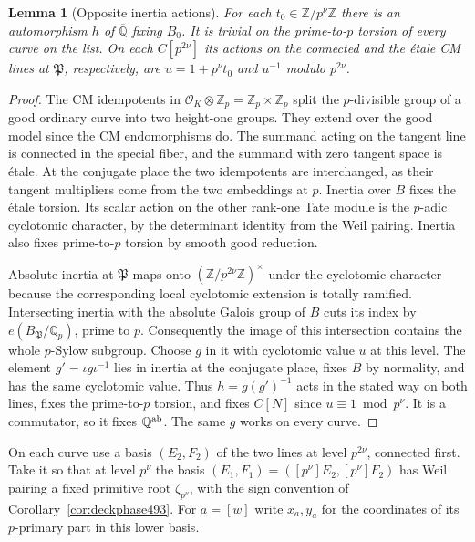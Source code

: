 \documentclass[a4paper,11pt]{article}
\newtheorem{lemma}[proposition]{Lemma}
\theoremstyle{definition}
\theoremstyle{remark}
\numberwithin{equation}{section}
\begin{document}
\begin{lemma}[Opposite inertia actions]\leavevmode
\label{lem:splitinertia494}
For each \(t_0\in\mathbb Z/p^\nu\mathbb Z\) there is an
automorphism \(h\) of \(\overline{\mathbb Q}\) fixing \(B_0\).
It is trivial on the prime-to-\(p\) torsion of every curve on the
list. On each \(C[p^{2\nu}]\) its actions on the connected and
the \'etale CM lines at \(\mathfrak P\), respectively, are
\(u=1+p^\nu t_0\) and \(u^{-1}\) modulo \(p^{2\nu}\).
\end{lemma}
\begin{proof}
The CM idempotents in
\(\mathcal O_K\otimes\mathbb Z_p=\mathbb Z_p\times\mathbb Z_p\)
split the \(p\)-divisible group of a good ordinary curve into
two height-one groups. They extend over the good model since
the CM endomorphisms do. The summand acting on the tangent line
is connected in the special fiber, and the summand with zero
tangent space is \'etale. At the conjugate place the two
idempotents are interchanged, as their tangent multipliers come
from the two embeddings at \(p\). Inertia over \(B\) fixes the
\'etale torsion. Its scalar action on the other rank-one Tate
module is the \(p\)-adic cyclotomic character, by the determinant
identity from the Weil pairing. Inertia also fixes prime-to-\(p\)
torsion by smooth good reduction.

Absolute inertia at \(\mathfrak P\) maps onto
\((\mathbb Z/p^{2\nu}\mathbb Z)^\times\) under the cyclotomic
character because the corresponding local cyclotomic extension
is totally ramified. Intersecting inertia with the absolute
Galois group of \(B\) cuts its index by
\(e(B_{\mathfrak P}/\mathbb Q_p)\), prime to \(p\).
Consequently the image of this intersection contains the whole
\(p\)-Sylow subgroup. Choose \(g\) in it with cyclotomic value
\(u\) at this level. The element \(g'=\iota g\iota^{-1}\) lies
in inertia at the conjugate place, fixes \(B\) by normality,
and has the same cyclotomic value. Thus \(h=g(g')^{-1}\) acts
in the stated way on both lines, fixes the prime-to-\(p\)
torsion, and fixes \(C[N]\) since \(u\equiv1\bmod p^\nu\).
It is a commutator, so it fixes \(\mathbb Q^{\rm ab}\). The same
\(g\) works on every curve.
\end{proof}

On each curve use a basis \((E_2,F_2)\) of the two lines at
level \(p^{2\nu}\), connected first. Take it so that at level
\(p^\nu\) the basis \((E_1,F_1)=([p^\nu]E_2,[p^\nu]F_2)\)
has Weil pairing a fixed primitive root \(\zeta_{p^\nu}\), with
the sign convention of Corollary~\ref{cor:deckphase493}.
For \(a=[w]\) write \(x_a,y_a\) for the coordinates of its
\(p\)-primary part in this lower basis.
\end{document}
